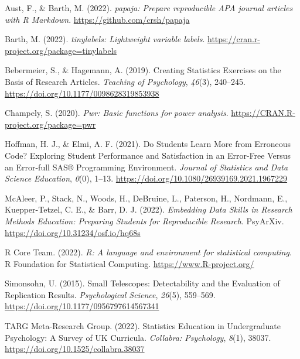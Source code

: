 \documentclass[
  man,floatsintext]{apa6}
\newlength{\cslhangindent}
\newlength{\cslentryspacingunit} %
\newenvironment{CSLReferences}[2] %
 {%
  \setlength{\parindent}{0pt}
  \ifodd #1
  \let\oldpar\par
  \def\par{\hangindent=\cslhangindent\oldpar}
  \fi
  \setlength{\parskip}{#2\cslentryspacingunit}
 }%
 {}
\begin{document}
\hypertarget{refs}{}
\begin{CSLReferences}{1}{0}
\leavevmode{}%
Aust, F., \& Barth, M. (2022). \emph{{papaja}: {Prepare} reproducible {APA} journal articles with {R Markdown}}. \url{https://github.com/crsh/papaja}

\leavevmode{}%
Barth, M. (2022). \emph{{tinylabels}: Lightweight variable labels}. \url{https://cran.r-project.org/package=tinylabels}

\leavevmode{}%
Bebermeier, S., \& Hagemann, A. (2019). Creating {Statistics} {Exercises} on the {Basis} of {Research} {Articles}. \emph{Teaching of Psychology}, \emph{46}(3), 240--245. \url{https://doi.org/10.1177/0098628319853938}

\leavevmode{}%
Champely, S. (2020). \emph{Pwr: Basic functions for power analysis}. \url{https://CRAN.R-project.org/package=pwr}

\leavevmode{}%
Hoffman, H. J., \& Elmi, A. F. (2021). Do {Students} {Learn} {More} from {Erroneous} {Code}? {Exploring} {Student} {Performance} and {Satisfaction} in an {Error}-{Free} {Versus} an {Error}-full {SAS}® {Programming} {Environment}. \emph{Journal of Statistics and Data Science Education}, \emph{0}(0), 1--13. \url{https://doi.org/10.1080/26939169.2021.1967229}

\leavevmode{}%
McAleer, P., Stack, N., Woods, H., DeBruine, L., Paterson, H., Nordmann, E., Kuepper-Tetzel, C. E., \& Barr, D. J. (2022). \emph{Embedding {Data} {Skills} in {Research} {Methods} {Education}: {Preparing} {Students} for {Reproducible} {Research}}. PsyArXiv. \url{https://doi.org/10.31234/osf.io/hq68s}

\leavevmode{}%
R Core Team. (2022). \emph{R: A language and environment for statistical computing}. R Foundation for Statistical Computing. \url{https://www.R-project.org/}

\leavevmode{}%
Simonsohn, U. (2015). Small {Telescopes}: {Detectability} and the {Evaluation} of {Replication} {Results}. \emph{Psychological Science}, \emph{26}(5), 559--569. \url{https://doi.org/10.1177/0956797614567341}

\leavevmode{}%
TARG Meta-Research Group. (2022). Statistics {Education} in {Undergraduate} {Psychology}: {A} {Survey} of {UK} {Curricula}. \emph{Collabra: Psychology}, \emph{8}(1), 38037. \url{https://doi.org/10.1525/collabra.38037}


\end{CSLReferences}
\end{document}
